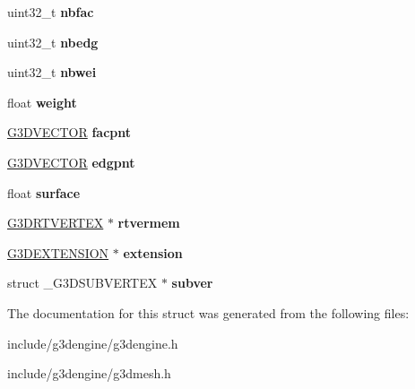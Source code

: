 \begin{DoxyCompactItemize}
\item 
\mbox{\label{struct__G3DVERTEX_a05bfa59c4f4d183ff1b148605353e336}} 
uint32\+\_\+t {\bfseries nbfac}
\item 
\mbox{\label{struct__G3DVERTEX_ad70b96f8b45c11d8a4779f0d58c625f6}} 
uint32\+\_\+t {\bfseries nbedg}
\item 
\mbox{\label{struct__G3DVERTEX_a1cbb7096622af76fb5b84c6425c23a5f}} 
uint32\+\_\+t {\bfseries nbwei}
\item 
\mbox{\label{struct__G3DVERTEX_a3c599f5c20b4c4006817278817d275e9}} 
float {\bfseries weight}
\item 
\mbox{\label{struct__G3DVERTEX_a9dcb3a95b512697296863ba392d60b39}} 
\hyperlink{struct__G3DVECTOR}{G3\+D\+V\+E\+C\+T\+OR} {\bfseries facpnt}
\item 
\mbox{\label{struct__G3DVERTEX_ab2670b69cc9220392b9759a4f5c8651e}} 
\hyperlink{struct__G3DVECTOR}{G3\+D\+V\+E\+C\+T\+OR} {\bfseries edgpnt}
\item 
\mbox{\label{struct__G3DVERTEX_a8d66921a7358047aa269addd56767a1b}} 
float {\bfseries surface}
\item 
\mbox{\label{struct__G3DVERTEX_a655e3d14e8b5e9dbfd8a9382b155a147}} 
\hyperlink{struct__G3DRTVERTEX}{G3\+D\+R\+T\+V\+E\+R\+T\+EX} $\ast$ {\bfseries rtvermem}
\item 
\mbox{\label{struct__G3DVERTEX_ad787300f8dd26420972d674b4f744eb7}} 
\hyperlink{struct__G3DEXTENSION}{G3\+D\+E\+X\+T\+E\+N\+S\+I\+ON} $\ast$ {\bfseries extension}
\item 
\mbox{\label{struct__G3DVERTEX_a2d38b8479ebceb505d983c452093c6cf}} 
struct \+\_\+\+G3\+D\+S\+U\+B\+V\+E\+R\+T\+EX $\ast$ {\bfseries subver}
\end{DoxyCompactItemize}


The documentation for this struct was generated from the following files\+:\begin{DoxyCompactItemize}
\item 
include/g3dengine/g3dengine.\+h\item 
include/g3dengine/g3dmesh.\+h\end{DoxyCompactItemize}

